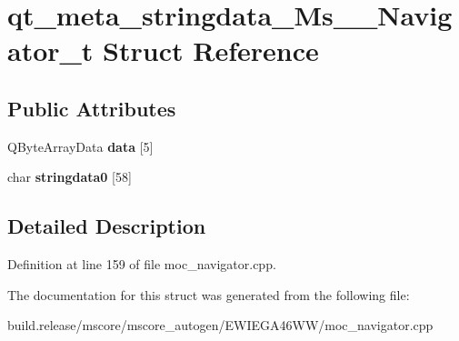 \hypertarget{structqt__meta__stringdata___ms_____navigator__t}{}\section{qt\+\_\+meta\+\_\+stringdata\+\_\+\+Ms\+\_\+\+\_\+\+Navigator\+\_\+t Struct Reference}
\label{structqt__meta__stringdata___ms_____navigator__t}
\subsection*{Public Attributes}
\begin{DoxyCompactItemize}
\item 
\mbox{\label{structqt__meta__stringdata___ms_____navigator__t_a27208bffe64c4fb82db97ef2b1760c90}} 
Q\+Byte\+Array\+Data {\bfseries data} \mbox{[}5\mbox{]}
\item 
\mbox{\label{structqt__meta__stringdata___ms_____navigator__t_ab2623e57a300b9ec834725763340a6c5}} 
char {\bfseries stringdata0} \mbox{[}58\mbox{]}
\end{DoxyCompactItemize}


\subsection{Detailed Description}


Definition at line 159 of file moc\+\_\+navigator.\+cpp.



The documentation for this struct was generated from the following file\+:\begin{DoxyCompactItemize}
\item 
build.\+release/mscore/mscore\+\_\+autogen/\+E\+W\+I\+E\+G\+A46\+W\+W/moc\+\_\+navigator.\+cpp\end{DoxyCompactItemize}
